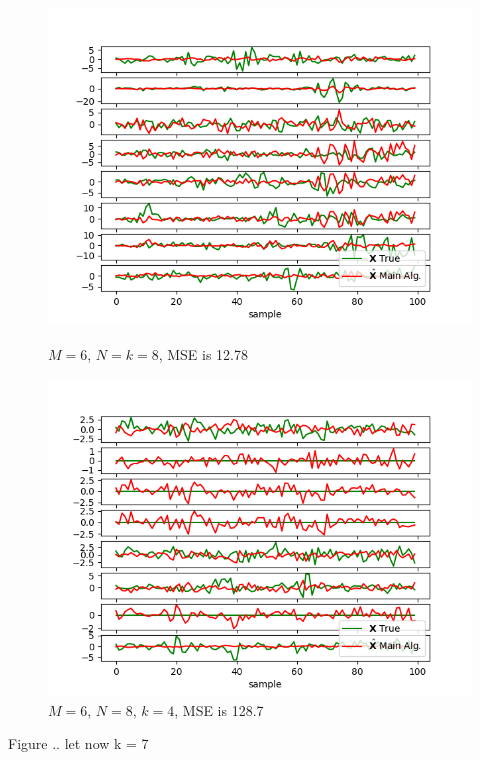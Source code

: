 \begin{figure}[H]
    \begin{minipage}[t]{.45\textwidth}
		\centering
		\includegraphics[scale=0.5]{figures/ch_estimate/k_test4.png}
	\caption{$M=6$, $N=k=8$, MSE is 12.78}
	\label{fig:ktest4}
    \end{minipage} 
    \hfill
    \begin{minipage}[t]{.45\textwidth}
		\centering
		\includegraphics[scale=0.5]{figures/ch_estimate/k_test5.png}
	\caption{$M=6$, $N=8$, $k=4$, MSE is 128.7}
	\label{fig:ktest5}
    \end{minipage}
\end{figure}

Figure .. let now k = 7

